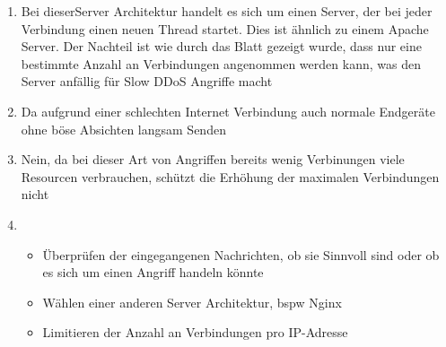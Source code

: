 \documentclass[a4paper,12pt,
headsepline,           %
oneside,               %
pointlessnumbers,      %
bibtotoc,              %
BCOR15mm               %
]{scrbook}
\begin{document}
\begin{enumerate}
    \item Bei dieserServer Architektur handelt es sich um einen Server, der bei jeder Verbindung einen neuen Thread startet. Dies ist ähnlich zu einem Apache Server. Der Nachteil ist wie durch das Blatt gezeigt wurde, dass nur eine bestimmte Anzahl an Verbindungen angenommen werden kann, was den Server anfällig für Slow DDoS Angriffe macht
    \item Da aufgrund einer schlechten Internet Verbindung auch normale Endgeräte ohne böse Absichten langsam Senden
    \item Nein, da bei dieser Art  von Angriffen bereits wenig Verbinungen viele Resourcen verbrauchen, schützt die Erhöhung der maximalen Verbindungen nicht
    \item \begin{itemize}
        \item Überprüfen der eingegangenen Nachrichten, ob sie Sinnvoll sind oder ob es sich um einen Angriff handeln könnte
        \item Wählen einer anderen Server Architektur, bspw Nginx
        \item Limitieren der Anzahl an Verbindungen pro IP-Adresse
    \end{itemize}
\end{enumerate}
\end{document}
